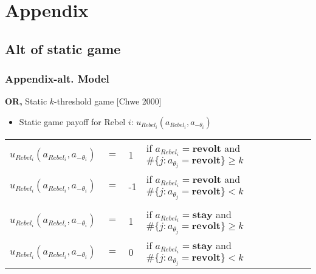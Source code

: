 \documentclass[9pt]{beamer}
\begin{document}
\section{Appendix}

\subsection{Alt of static game}

\begin{frame}[label=alt_static_game]
  \frametitle{Appendix-alt. Model}
\alert{\textbf{OR,}}
Static $k$-threshold game [Chwe 2000]
  \begin{itemize}
 
  \item Static game payoff for Rebel $i$: $u_{Rebel_i}(a_{Rebel_i},a_{-\theta_i})$
\end{itemize}
  \begin{table}[h]
\begin{tabular}{llll}
$u_{Rebel_i}(a_{Rebel_i},a_{-\theta_i})$ & $=$ & 1 & if $a_{Rebel_i}=\textbf{revolt}$ and $\#\{j:a_{\theta_j}=\textbf{revolt}\}\geq k$ \\
$u_{Rebel_i}(a_{Rebel_i},a_{-\theta_i})$ & $=$ & -1 & if $a_{Rebel_i}=\textbf{revolt}$ and $\#\{j:a_{\theta_j}=\textbf{revolt}\}< k$  \\
\\
$u_{Rebel_i}(a_{Rebel_i},a_{-\theta_i})$ & $=$ & 1 & if $a_{Rebel_i}=\textbf{stay}$ and $\#\{j:a_{\theta_j}=\textbf{revolt}\}\geq k$ \\
$u_{Rebel_i}(a_{Rebel_i},a_{-\theta_i})$ & $=$ & 0 & if $a_{Rebel_i}=\textbf{stay}$ and $\#\{j:a_{\theta_j}=\textbf{revolt}\}< k$ \\

\end{tabular}

\end{table}

\begin{itemize}

\end{itemize}

\end{frame}
\end{document}
